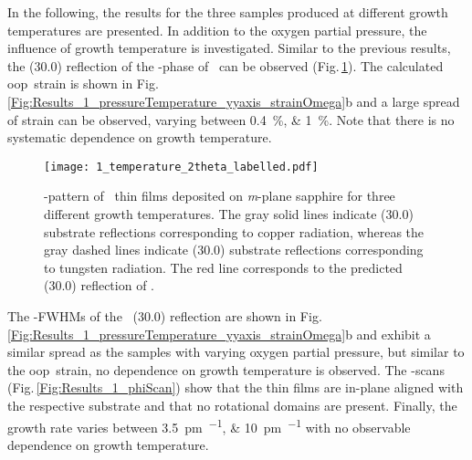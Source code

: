 In the following, the results for the three samples produced at different growth temperatures are presented.
In addition to the oxygen partial pressure, the influence of growth temperature is investigated.  
Similar to the previous results, the (30.0) reflection of the \textalpha-phase of \cro\ can be observed (Fig.\,\ref{Fig:Results_1_temperature_2theta}).
The calculated \gls{oop}\ strain is shown in Fig.\,\ref{Fig:Results_1_pressureTemperature_yyaxis_strainOmega}b and a large spread of strain can be observed, varying between \qtylist{0.4;1}{\percent}.
Note that there is no systematic dependence on growth temperature.
\begin{figure}
    \centering
    \texttt{[image: 1\_temperature\_2theta\_labelled.pdf]}
    \caption{
        \thetaomega-pattern of \cro\ thin films deposited on \textit{m}-plane sapphire for three different growth temperatures.
        The gray solid lines indicate (30.0) substrate reflections corresponding to copper radiation, whereas the gray dashed lines indicate (30.0) substrate reflections corresponding to tungsten radiation.
        The red line corresponds to the predicted (30.0) reflection of \cro.
    }
    \label{Fig:Results_1_temperature_2theta}
\end{figure}
The \textomega-FWHMs of the \cro\ (30.0) reflection are shown in Fig.\,\ref{Fig:Results_1_pressureTemperature_yyaxis_strainOmega}b and exhibit a similar spread as the samples with varying oxygen partial pressure, but similar to the \gls{oop}\ strain, no dependence on growth temperature is observed.
The \textphi-scans (Fig.\,\ref{Fig:Results_1_phiScan}) show that the thin films are in-plane aligned with the respective substrate and that no rotational domains are present.
Finally, the growth rate varies between \qtylist{3.5;10}{\pm\per\pulse} with no observable dependence on growth temperature.